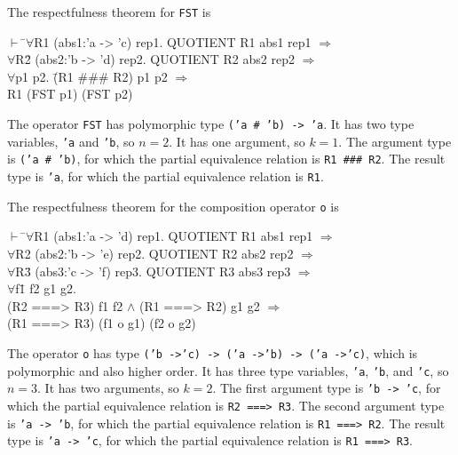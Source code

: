 \documentclass[envcountsame,runningheads]{llncs}
\newcommand{\quotient}{partial equivalence}
\begin{document}
The respectfulness theorem for {\tt FST} is
{\tt \begin{tabbing}
\hspace{5.5mm}
    $\vdash$ \=$\forall$R1 (abs1:'a -> 'c) rep1. QUOTIENT R1 abs1 rep1 $\Rightarrow$ \\
\>     $\forall$R\=2 (abs2:'b -> 'd) rep2. QUOTIENT R2 abs2 rep2 $\Rightarrow$ \\
\>\>     $\forall$p1 p2. \=(R1 \#\#\# R2) p1 p2 $\Rightarrow$ \\
\>\>\>           R1 (FST p1) (FST p2)
\end{tabbing}}
The operator {\tt FST} has polymorphic type {\tt ('a \# 'b) -> 'a}. 
It has two type variables, {\tt 'a} and {\tt 'b}, so $n = 2$. 
It has one argument, so $k = 1$.
The argument type is
{\tt ('a \# 'b)},
for which
the \quotient{} relation
is {\tt R1 \#\#\# R2}.
The result type is
{\tt 'a},
for which
the \quotient{} relation
is {\tt R1}.

The respectfulness theorem for the composition operator {\tt o} is
{\tt \begin{tabbing}
\hspace{5.5mm}
    $\vdash$ \=$\forall$R1 (abs1:'a -> 'd) rep1. QUOTIENT R1 abs1 rep1 $\Rightarrow$ \\
\>     $\forall$R2 (abs2:'b -> 'e) rep2. QUOTIENT R2 abs2 rep2 $\Rightarrow$ \\
\>     $\forall$R\=3 (abs3:'c -> 'f) rep3. QUOTIENT R3 abs3 rep3 $\Rightarrow$ \\
\>\>     $\forall$f\=1 f2 g1 g2. \\
\>\>\>     (R2 ===> R3) f1 f2 $\wedge$ (R1 ===> R2) g1 g2 $\Rightarrow$ \\
\>\>\>     (R1 ===> R3) (f1 o g1) (f2 o g2)
\end{tabbing}}
The operator {\tt o} has type
{\tt ('b ->\;'c) -> ('a ->\;'b) -> ('a ->\;'c)},
which is polymorphic and also higher order.
It has three type variables, {\tt 'a}, {\tt 'b}, and {\tt 'c}, so $n = 3$. 
It has two arguments, so $k = 2$.
The first argument type is
{\tt 'b -> 'c},
for which
the \quotient{} relation
is {\tt R2 ===> R3}.
The second argument type is
{\tt 'a -> 'b},
for which
the \quotient{} relation
is {\tt R1 ===> R2}.
The result type is
{\tt 'a -> 'c},
for which
the \quotient{} relation
is {\tt R1 ===> R3}.
\end{document}
